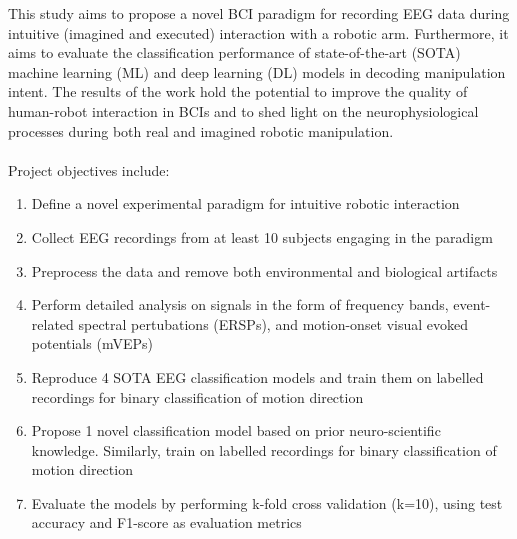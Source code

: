This study aims to propose a novel BCI paradigm for recording EEG data during intuitive (imagined and executed) interaction with a robotic arm. Furthermore, it aims to evaluate the classification performance of state-of-the-art (SOTA) machine learning (ML) and deep learning (DL) models in decoding manipulation intent. The results of the work hold the potential to improve the quality of human-robot interaction in BCIs and to shed light on the neurophysiological processes during both real and imagined robotic manipulation.
\\\\
Project objectives include:
\begin{enumerate}
    \item Define a novel experimental paradigm for intuitive robotic interaction
    \item Collect EEG recordings from at least 10 subjects engaging in the paradigm
    \item Preprocess the data and remove both environmental and biological artifacts
    \item Perform detailed analysis on signals in the form of frequency bands, event-related spectral pertubations (ERSPs), and motion-onset visual evoked potentials (mVEPs)
    \item Reproduce 4 SOTA EEG classification models and train them on labelled recordings for binary classification of motion direction
    \item Propose 1 novel classification model based on prior neuro-scientific knowledge. Similarly, train on labelled recordings for binary classification of motion direction
    \item Evaluate the models by performing k-fold cross validation (k=10), using test accuracy and F1-score as evaluation metrics
\end{enumerate}





\afterpage{\blankpage}

